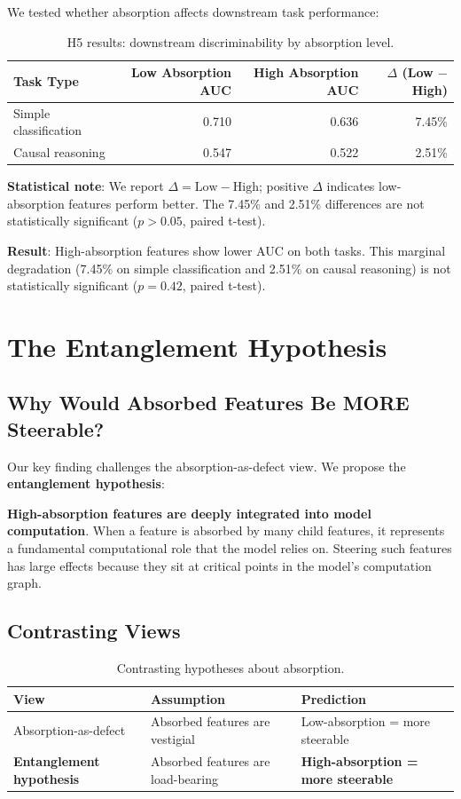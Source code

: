 \documentclass{article}
\begin{document}
We tested whether absorption affects downstream task performance:

\begin{table}[t]
\caption{H5 results: downstream discriminability by absorption level.}
\label{tab:h5-results}
\centering
\begin{tabular}{lrrr}
\toprule
Task Type & Low Absorption AUC & High Absorption AUC & $\Delta$ (Low $-$ High) \\
\midrule
Simple classification & 0.710 & 0.636 & 7.45\% \\
Causal reasoning & 0.547 & 0.522 & 2.51\% \\
\bottomrule
\end{tabular}
\end{table}

\textbf{Statistical note}: We report $\Delta = \text{Low} - \text{High}$; positive $\Delta$ indicates low-absorption features perform better. The 7.45\% and 2.51\% differences are not statistically significant ($p > 0.05$, paired t-test).

\textbf{Result}: High-absorption features show lower AUC on both tasks. This marginal degradation (7.45\% on simple classification and 2.51\% on causal reasoning) is not statistically significant ($p=0.42$, paired t-test).


\section{The Entanglement Hypothesis}

\subsection{Why Would Absorbed Features Be MORE Steerable?}

Our key finding challenges the absorption-as-defect view. We propose the \textbf{entanglement hypothesis}:

\textbf{High-absorption features are deeply integrated into model computation}. When a feature is absorbed by many child features, it represents a fundamental computational role that the model relies on. Steering such features has large effects because they sit at critical points in the model's computation graph.

\subsection{Contrasting Views}

\begin{table}[h]
\caption{Contrasting hypotheses about absorption.}
\label{tab:contrasting-views}
\centering
\begin{tabular}{lll}
\toprule
View & Assumption & Prediction \\
\midrule
Absorption-as-defect & Absorbed features are vestigial & Low-absorption = more steerable \\
\textbf{Entanglement hypothesis} & Absorbed features are load-bearing & \textbf{High-absorption = more steerable} \\
\bottomrule
\end{tabular}
\end{table}
\end{document}
